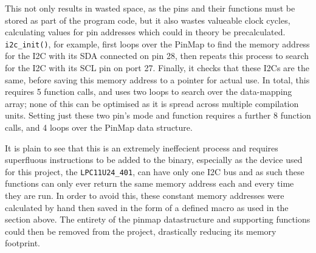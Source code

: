 This not only results in wasted space, as the pins and their functions must be stored as part of the program code, but it also wastes valueable clock cycles, calculating values for pin addresses which could in theory be precalculated. \verb|i2c_init()|, for example, first loops over the PinMap to find the memory address for the I2C with its SDA connected on pin 28, then repeats this process to search for the I2C with its SCL pin on port 27. Finally, it checks that these I2Cs are the same, before saving this memory address to a pointer for actual use. In total, this requires 5 function calls, and uses two loops to search over the data-mapping array; none of this can be optimised as it is spread across multiple compilation units. Setting just these two pin's mode and function requires a further 8 function calls, and 4 loops over the PinMap data structure.

It is plain to see that this is an extremely ineffecient process and requires superfluous instructions to be added to the binary, especially as the device used for this project, the \verb|LPC11U24_401|, can have only one I2C bus and as such these functions can only ever return the same memory address each and every time they are run. In order to avoid this, these constant memory addresses were calculated by hand then saved in the form of a defined macro as used in the section above. The entirety of the pinmap datastructure and supporting functions could then be removed from the project, drastically reducing its memory footprint.